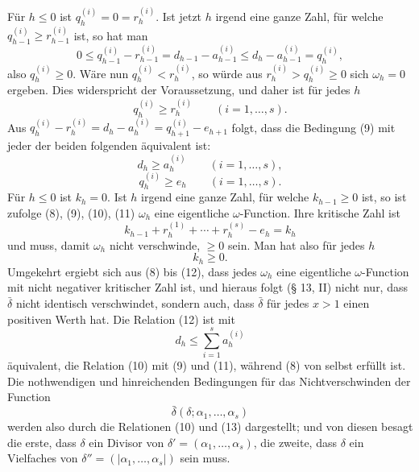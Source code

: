 \documentclass[11pt,a4paper]{article}
\begin{document}
Für $h\le0$ ist $q_h^{(i)}=0=r_h^{(i)}$. Ist jetzt $h$ irgend eine ganze Zahl, für welche $q_{h-1}^{(i)}\ge r_{h-1}^{(i)}$ ist, so hat man
\[
 0\le q_{h-1}^{(i)}-r_{h-1}^{(i)}=d_{h-1}-a_{h-1}^{(i)}\le d_h-a_{h-1}^{(i)}=q_h^{(i)},
\]
also $q_h^{(i)}\ge0$. Wäre nun $q_h^{(i)}<r_h^{(i)}$, so würde aus $r_h^{(i)}>q_h^{(i)}\ge0$ sich $\omega_h=0$ ergeben. Dies widerspricht der Voraussetzung, und daher ist für jedes $h$
\begin{equation}
 q_h^{(i)}\ge r_h^{(i)}\qquad(i=1,
\ldots,s).
\tag{9}
\end{equation}
Aus $q_h^{(i)}-r_h^{(i)}=d_h-a_h^{(i)}=q_{h+1}^{(i)}-e_{h+1}$ folgt, dass die Bedingung (9) mit jeder der beiden folgenden äquivalent ist:
\begin{equation}
 d_h\ge a_h^{(i)}\qquad(i=1,
\ldots,s),
\tag{10}
\end{equation}
\begin{equation}
 q_h^{(i)}\ge e_h\qquad(i=1,
\ldots,s).
\tag{11}
\end{equation}
Für $h\le0$ ist $k_h=0$. Ist $h$ irgend eine ganze Zahl, für welche $k_{h-1}\ge0$ ist, so ist zufolge (8), (9), (10), (11) $\omega_h$ eine eigentliche $\omega$-Function. Ihre kritische Zahl ist
\[
 k_{h-1}+r_h^{(1)}+\cdots+r_h^{(s)}-e_h=k_h
\]
und muss, damit $\omega_h$ nicht verschwinde, $\ge0$ sein. Man hat also für jedes $h$
\begin{equation}
 k_h\ge0.
\tag{12}
\end{equation}
Umgekehrt ergiebt sich aus (8) bis (12), dass jedes $\omega_h$ eine eigentliche $\omega$-Function mit nicht negativer kritischer Zahl ist, und hieraus folgt (§ 13, II) nicht nur, dass $\bar\delta$ nicht identisch verschwindet, sondern auch, dass $\bar\delta$ für jedes $x>1$ einen positiven Werth hat. Die Relation (12) ist mit
\begin{equation}
 d_h\le\sum_{i=1}^s a_h^{(i)}
\tag{13}
\end{equation}
äquivalent, die Relation (10) mit (9) und (11), während (8) von selbst erfüllt ist. Die nothwendigen und hinreichenden Bedingungen für das Nichtverschwinden der Function
\[
 \bar\delta(\delta;\alpha_1,
\ldots,\alpha_s)
\]
werden also durch die Relationen (10) und (13) dargestellt; und von diesen besagt die erste, dass $\delta$ ein Divisor von $\delta'=(\alpha_1,
\ldots,\alpha_s)$, die zweite, dass $\delta$ ein Vielfaches von $\delta''=(|\alpha_1,
\ldots,\alpha_s|)$ sein muss.
\end{document}
